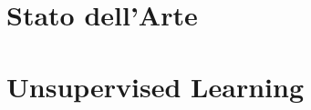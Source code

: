 \documentclass[a4paper,12pt,oneside]{book}
\begin{document}
\chapter{Stato dell'Arte}
\label{cap:capitolo1}

\chapter{Unsupervised Learning}
\label{cap:capitolo2}


%
%
%

\end{document}
